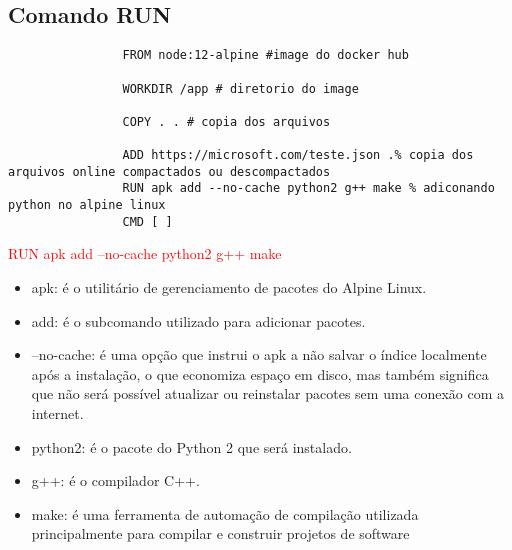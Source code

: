 \documentclass{article}
\begin{document}
        \subsection{Comando RUN}
            \begin{lstlisting}
                FROM node:12-alpine #image do docker hub

                WORKDIR /app # diretorio do image

                COPY . . # copia dos arquivos

                ADD https://microsoft.com/teste.json .% copia dos arquivos online compactados ou descompactados
                RUN apk add --no-cache python2 g++ make % adiconando python no alpine linux
                CMD [ ]
            \end{lstlisting}    
            \textcolor{red}{RUN apk add --no-cache python2 g++ make}
            \begin{itemize}
                \item apk: é o utilitário de gerenciamento de pacotes do Alpine Linux.
                \item add: é o subcomando utilizado para adicionar pacotes.
                \item --no-cache: é uma opção que instrui o apk a não salvar o índice localmente após a instalação, o que economiza espaço em disco, mas também significa que não será possível atualizar ou reinstalar pacotes sem uma conexão com a internet.
                \item python2: é o pacote do Python 2 que será instalado.
                \item g++: é o compilador C++.
                \item make: é uma ferramenta de automação de compilação utilizada principalmente para compilar e construir projetos de software
            \end{itemize}
        
    

    
\end{document}
